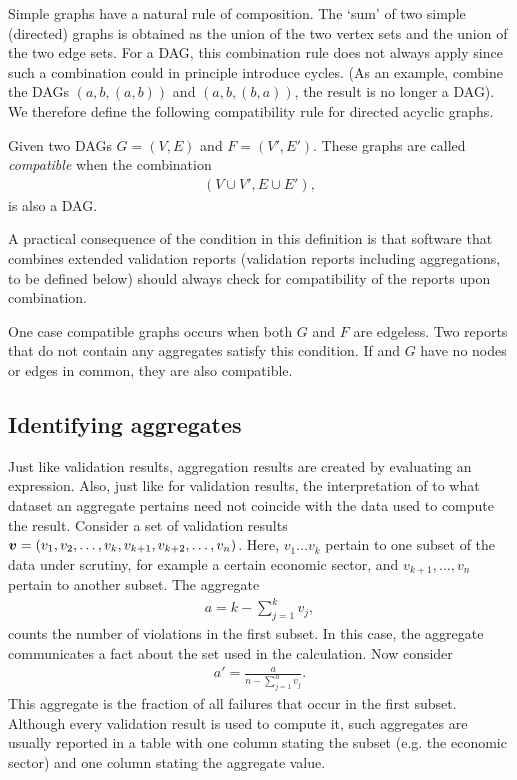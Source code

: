 Simple graphs have a natural rule of composition. The `sum' of two simple
(directed) graphs is obtained as the union of the two vertex sets and the union
of the two edge sets. For a DAG, this combination rule does not always apply
since such a combination could in principle introduce cycles. (As an example,
combine the DAGs $({a,b},{(a,b)})$ and $({a,b},{(b,a)})$, the result is no
longer a DAG). We therefore define the following compatibility rule for
directed acyclic graphs.
\begin{definition}
\label{def:compatibledag}
Given two DAGs $G=(V,E)$ and $F=(V',E')$. These graphs are called
\emph{compatible} when the combination
\begin{align*}
 (V\cup V', E\cup E'),
\end{align*}
is also a DAG.
\end{definition}
A practical consequence of the condition in this definition is that software
that combines extended validation reports (validation reports including
aggregations, to be defined below) should always check for compatibility of the
reports upon combination. 

One case compatible graphs occurs when both $G$ and $F$ are edgeless. Two
reports that do not contain any aggregates satisfy this condition. If and $G$
have no nodes or edges in common, they are also compatible. 


\subsection{Identifying aggregates}
Just like validation results, aggregation results are created by evaluating an
expression. Also, just like for validation results, the interpretation of to
what dataset an aggregate pertains need not coincide with the data used to
compute the result. Consider a set of validation results
$\boldsymbol{v}=(v_1,v_2,\ldots,v_k,v_{k+1},v_{k+2},\ldots, v_n)$. Here,
$v_1\ldots v_k$ pertain to one subset of the data under scrutiny, for example a
certain economic sector, and $v_{k+1},\ldots,v_n$ pertain to another subset.
The aggregate
\begin{align*}
a = k - \sum_{j=1}^{k}v_j,
\end{align*}
counts the number of violations in the first subset. In this case, the
aggregate communicates a fact about the set used in the calculation.
Now consider
\begin{align*}
a' = \frac{a}{n-\sum_{j=1}^n{v_j}}.
\end{align*}
This aggregate is the fraction of all failures that occur in the first subset.
Although every validation result is used to compute it, such aggregates are
usually reported in a table with one column stating the subset (e.g. the
economic sector) and one column stating the aggregate value. 

